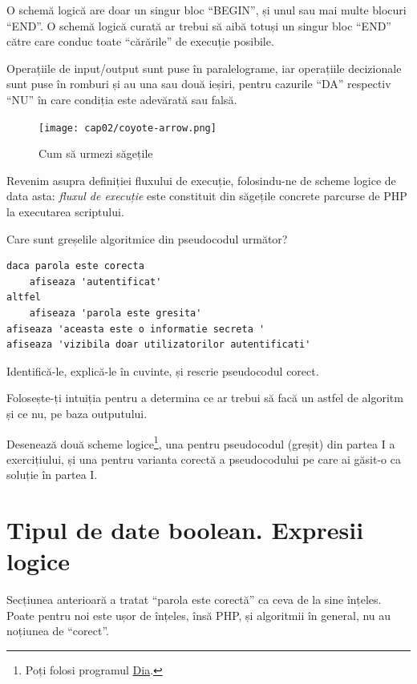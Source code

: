 O schemă logică are doar un singur bloc ``BEGIN'', și unul
sau mai multe blocuri ``END''. O schemă logică curată
ar trebui să aibă totuși un singur bloc ``END''
către care conduc toate ``cărările'' de execuție posibile.

Operațiile de input/output sunt puse în paralelograme,
iar operațiile decizionale sunt puse în romburi și au
una sau două ieșiri, pentru cazurile ``DA'' respectiv ``NU''
în care condiția este adevărată sau falsă.

\begin{figure}[ht!]
  \centering
    \texttt{[image: cap02/coyote-arrow.png]}
  \caption{Cum să urmezi săgețile}
  \label{fig:coyote arrow}
\end{figure}

Revenim asupra definiției fluxului de execuție, folosindu-ne de scheme logice de data asta:
\textit{fluxul de execuție} este constituit din săgețile concrete parcurse de PHP
la executarea scriptului.

\begin{Exercise}[difficulty=2,title={Găsește eroarea de logică}]
\ExePart
Care sunt greșelile algoritmice din pseudocodul următor?

\begin{lstlisting}[language=pseudocode]
daca parola este corecta
	afiseaza 'autentificat'
altfel
	afiseaza 'parola este gresita'
afiseaza 'aceasta este o informatie secreta '
afiseaza 'vizibila doar utilizatorilor autentificati'
\end{lstlisting}

Identifică-le, explică-le în cuvinte, și rescrie pseudocodul corect.

Folosește-ți intuiția pentru a determina ce ar trebui
să facă un astfel de algoritm și ce nu, pe baza outputului.

\ExePart
Desenează două scheme logice\footnote{Poți folosi programul
\href{http://projects.gnome.org/dia/}{Dia}.}, una pentru pseudocodul (greșit)
din partea I a exercițiului, și una pentru varianta corectă
a pseudocodului pe care ai găsit-o ca soluție în partea I.
\end{Exercise}


\section{Tipul de date boolean. Expresii logice}
\label{sec:tipul de date boolean. Expresii logice}

Secțiunea anterioară a tratat ``parola este corectă'' ca ceva
de la sine înțeles. Poate pentru noi este ușor de înțeles,
însă PHP, și algoritmii în general, nu au noțiunea de ``corect''.

